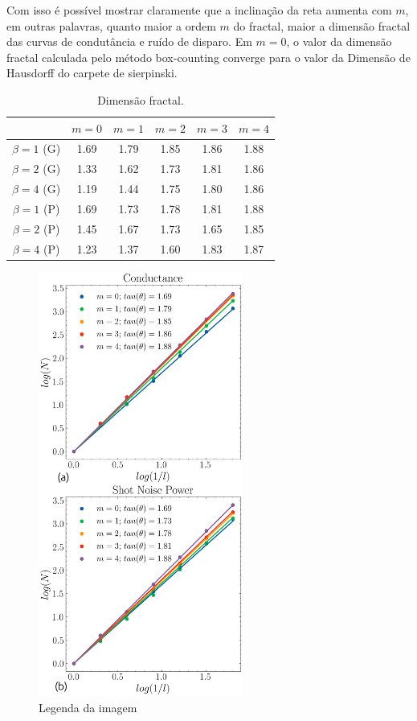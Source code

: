 \documentclass{article}
\begin{document}
	Com isso é possível mostrar claramente que a inclinação da reta aumenta com $m$, em outras palavras, quanto maior a ordem $m$ do fractal, maior a dimensão fractal das curvas de condutância e ruído de disparo. Em $m=0$, o valor da dimensão fractal calculada pelo método box-counting converge para o valor da Dimensão de Hausdorff do carpete de sierpinski.
	
	\begin{table}[h!]
		\centering
		\begin{tabular}{c|ccccc}
			\hline
			& $m=0$ & $m=1$ & $m=2$ & $m=3$ & $m=4$ \\
			\hline
			$\beta = 1$ (G) & 1.69 & 1.79 & 1.85 & 1.86 & 1.88 \\
			$\beta = 2$ (G) & 1.33 & 1.62 & 1.73 & 1.81 & 1.86 \\
			$\beta = 4$ (G) & 1.19 & 1.44 & 1.75 & 1.80 & 1.86 \\
			$\beta = 1$ (P) & 1.69 & 1.73 & 1.78 & 1.81 & 1.88 \\
			$\beta = 2$ (P) & 1.45 & 1.67 & 1.73 & 1.65 & 1.85 \\
			$\beta = 4$ (P) & 1.23 & 1.37 & 1.60 & 1.83 & 1.87 \\
			\hline
		\end{tabular}
		\caption{Dimensão fractal.}
		\label{tab:beta_m}
	\end{table}
	
	
	
	\begin{figure}[htbp]  %
		\centering
		\includegraphics[width=0.6\textwidth]{fig5.png}
		\caption{Legenda da imagem}
		\label{fig:minha_imagem}
	\end{figure}
	
	
\end{document}
